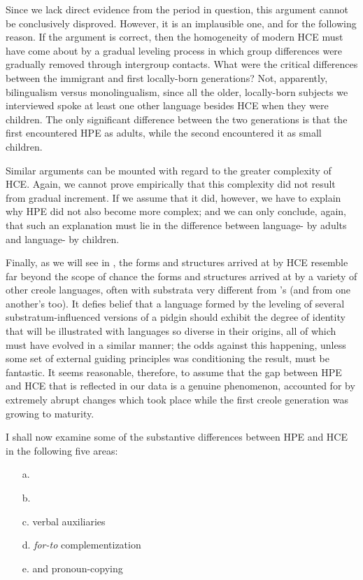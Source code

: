 Since we lack direct evidence from the period in question, this argument cannot be conclusively disproved. However, it is an im\-plausible one, and for the following reason. If the argument is correct, then the homogeneity of modern HCE must have come about by a gradual leveling process in which group differences were gradually removed through intergroup contacts. What were the critical differ\-ences between the immigrant and first locally-born generations? Not, apparently, bilingualism versus monolingualism, since all the older, locally-born subjects we interviewed spoke at least one other language besides HCE when they were children. The only significant difference between the two generations is that the first encountered HPE as adults, while the second encountered it as small children.

Similar arguments can be mounted with regard to the greater complexity of HCE. Again, we cannot prove empirically that this complexity did not result from gradual increment. If we assume that it did, however, we have to explain why HPE did not also become more complex; and we can only conclude, again, that such an explanation must lie in the difference between language- by adults and language- by children.

Finally, as we will see in , the forms and structures arrived at by HCE resemble far beyond the scope of chance the forms
and structures arrived at by a variety of other creole languages, often with substrata very different from 's (and from one another's too). It defies belief that a language formed by the leveling of several substratum-influenced versions of a pidgin should exhibit the degree of identity that will be illustrated with languages so diverse in their origins, all of which must have evolved in a similar manner; the odds against this happening, unless some set of external guiding principles was condi\-tioning the result, must be fantastic. It seems reasonable, therefore, to assume that the gap between HPE and HCE that is reflected in our data is a genuine phenomenon, accounted for by extremely abrupt changes which took place while the first creole generation was growing to maturity.

I shall now examine some of the substantive differences between HPE and HCE in the following five areas:

\begin{enumerate}
\item[a.] 
\item[b.] 
\item[c.] verbal auxiliaries
\item[d.] \textit{for-to} complementization
\item[e.]  and pronoun-copying
\end{enumerate}
 
